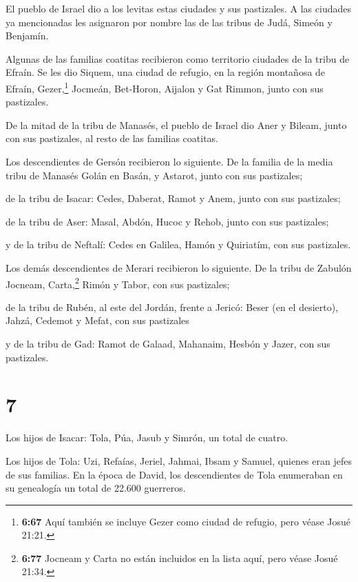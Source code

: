  El pueblo de Israel dio a los levitas estas ciudades y sus
pastizales.  A las ciudades ya mencionadas les asignaron
por nombre las de las tribus de Judá, Simeón y Benjamín.

 Algunas de las familias coatitas recibieron como
territorio ciudades de la tribu de Efraín.  Se les dio
Siquem, una ciudad de refugio, en la región montañosa de Efraín,
Gezer,\footnote{\textbf{6:67} Aquí también se incluye Gezer como ciudad
  de refugio, pero véase Josué 21:21.}  Jocmeán, Bet-Horon,
 Aijalon y Gat Rimmon, junto con sus pastizales.

 De la mitad de la tribu de Manasés, el pueblo de Israel
dio Aner y Bileam, junto con sus pastizales, al resto de las familias
coatitas.

 Los descendientes de Gersón recibieron lo siguiente. De la
familia de la media tribu de Manasés Golán en Basán, y Astarot, junto
con sus pastizales;

 de la tribu de Isacar: Cedes, Daberat,  Ramot
y Anem, junto con sus pastizales;

 de la tribu de Aser: Masal, Abdón,  Hucoc y
Rehob, junto con sus pastizales;

 y de la tribu de Neftalí: Cedes en Galilea, Hamón y
Quiriatím, con sus pastizales.

 Los demás descendientes de Merari recibieron lo siguiente.
De la tribu de Zabulón Jocneam, Carta,\footnote{\textbf{6:77} Jocneam y
  Carta no están incluidos en la lista aquí, pero véase Josué 21:34.}
Rimón y Tabor, con sus pastizales;

 de la tribu de Rubén, al este del Jordán, frente a Jericó:
Beser (en el desierto), Jahzá,  Cedemot y Mefat, con sus
pastizales

 y de la tribu de Gad: Ramot de Galaad, Mahanaim,
 Hesbón y Jazer, con sus pastizales.

\hypertarget{section-6}{%
\section{7}\label{section-6}}

 Los hijos de Isacar: Tola, Púa, Jasub y Simrón, un total de
cuatro.

 Los hijos de Tola: Uzi, Refaías, Jeriel, Jahmai, Ibsam y
Samuel, quienes eran jefes de sus familias. En la época de David, los
descendientes de Tola enumeraban en su genealogía un total de 22.600
guerreros.

